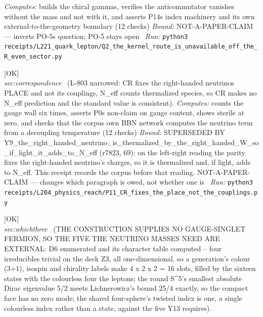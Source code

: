 \begin{description}
\emph{Computes:} builds the chiral gammas, verifies the anticommutator vanishes without the mass and not with it, and asserts P14s index machinery and its own external-to-the-geometry boundary (12 checks)
 \emph{Bound:} NOT-A-PAPER-CLAIM --- inverts PO-5s question; PO-5 stays open
\ \emph{Run:} \texttt{python3 receipts/L221\_quark\_lepton/Q2\_the\_kernel\_route\_is\_unavailable\_off\_the\_R\_even\_sector.py}
\item[\label{rcpt:P11_CR_fixes_the_place_not_the_couplings}\textbf{}\quad\texttt{P11\_CR\_fixes\_the\_place\_not\_the\_couplings}]\hfill\textsf{[OK]}\\
\textit{sec:correspondence} \ (L-803 narrowed: CR fixes the right-handed neutrinos PLACE and not its couplings, N\_eff counts thermalized species, so CR makes no N\_eff prediction and the standard value is consistent). 
\emph{Computes:} counts the gauge wall six times, asserts P0s non-claim on gauge content, shows sterile at zero, and checks that the corpus own BBN network computes the neutrino term from a decoupling temperature (12 checks)
 \emph{Bound:} SUPERSEDED BY Y9\_the\_right\_handed\_neutrino\_is\_thermalized\_by\_the\_right\_handed\_W\_so\_if\_light\_it\_adds\_to\_N\_eff (r7823, 69): on the left-right reading the parity fixes the right-handed neutrino's charges, so it is thermalized and, if light, adds to N\_eff. This receipt records the corpus before that reading. NOT-A-PAPER-CLAIM --- changes which paragraph is owed, not whether one is
\ \emph{Run:} \texttt{python3 receipts/L204\_physics\_reach/P11\_CR\_fixes\_the\_place\_not\_the\_couplings.py}
\item[\label{rcpt:Y14_the_construction_supplies_no_gauge_singlet_fermion_so_the_five_the_neutrino_masses_need_are_external}\textbf{}\quad\texttt{Y14\_the\_construction\_supplies\_no\_gauge\_singlet\_fermion\_so\_the\_five\_the\_neutrino\_masses\_need\_are\_external}]\hfill\textsf{[OK]}\\
\textit{sec:whichthree} \ (THE CONSTRUCTION SUPPLIES NO GAUGE-SINGLET FERMION, SO THE FIVE THE NEUTRINO MASSES NEED ARE EXTERNAL: D6 enumerated and its character table computed -- four irreducibles trivial on the deck Z3, all one-dimensional, so a generation's colour (3+1), isospin and chirality labels make 4 x 2 x 2 = 16 slots, filled by the sixteen states with the colourless four the leptons; the round S\textasciicircum{}5's smallest absolute Dirac eigenvalue 5/2 meets Lichnerowicz's bound 25/4 exactly, so the compact face has no zero mode; the shared four-sphere's twisted index is one, a single colourless index rather than a state, against the five Y13 requires). 

\end{description}
